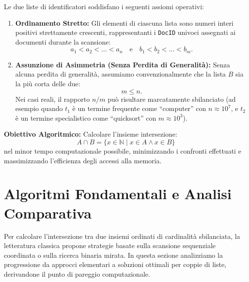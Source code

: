 \begin{property}
Le due liste di identificatori soddisfano i seguenti assiomi operativi:
\begin{enumerate}
  \item \textbf{Ordinamento Stretto:} Gli elementi di ciascuna lista sono numeri interi positivi strettamente crescenti, rappresentanti i \texttt{DocID} univoci assegnati ai documenti durante la scansione:
  \begin{equation}
    a_1 < a_2 < \dots < a_n \quad \text{e} \quad b_1 < b_2 < \dots < b_m.
  \end{equation}
  \item \textbf{Assunzione di Asimmetria (Senza Perdita di Generalità):} Senza alcuna perdita di generalità, assumiamo convenzionalmente che la lista $B$ sia la più corta delle due:
  \begin{equation}
    m \le n.
  \end{equation}
  Nei casi reali, il rapporto $n/m$ può risultare marcatamente sbilanciato (ad esempio quando $t_1$ è un termine frequente come ``computer'' con $n \approx 10^7$, e $t_2$ è un termine specialistico come ``quicksort'' con $m \approx 10^3$).
\end{enumerate}
\end{property}

\textbf{Obiettivo Algoritmico:} Calcolare l'insieme intersezione:
\begin{equation}
  A \cap B = \{x \in \mathbb{N} \mid x \in A \land x \in B\}
\end{equation}
nel minor tempo computazionale possibile, minimizzando i confronti effettuati e massimizzando l'efficienza degli accessi alla memoria.

\FloatBarrier
\section{Algoritmi Fondamentali e Analisi Comparativa}
\label{sec:fundamental-intersection-algorithms}

Per calcolare l'intersezione tra due insiemi ordinati di cardinalit\`a sbilanciata, la letteratura classica propone strategie basate sulla scansione sequenziale coordinata o sulla ricerca binaria mirata. In questa sezione analizziamo la progressione da approcci elementari a soluzioni ottimali per coppie di liste, derivandone il punto di pareggio computazionale.

\FloatBarrier
